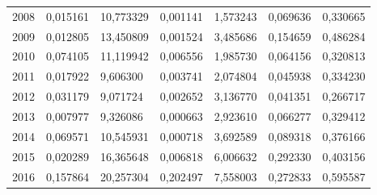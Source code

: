 \begin{table}
\begin{tabular}{p{1cm}p{2cm}p{2cm}p{2cm}p{2cm}p{2cm}p{2cm}}
 2008 &                                          0,015161 &                                   10,773329 &                         0,001141 &                   1,573243 &                       0,069636 &                    0,330665 \\
 2009 &                                          0,012805 &                                   13,450809 &                         0,001524 &                   3,485686 &                       0,154659 &                    0,486284 \\
 2010 &                                          0,074105 &                                   11,119942 &                         0,006556 &                   1,985730 &                       0,064156 &                    0,320813 \\
 2011 &                                          0,017922 &                                    9,606300 &                         0,003741 &                   2,074804 &                       0,045938 &                    0,334230 \\
 2012 &                                          0,031179 &                                    9,071724 &                         0,002652 &                   3,136770 &                       0,041351 &                    0,266717 \\
 2013 &                                          0,007977 &                                    9,326086 &                         0,000663 &                   2,923610 &                       0,066277 &                    0,329412 \\
 2014 &                                          0,069571 &                                   10,545931 &                         0,000718 &                   3,692589 &                       0,089318 &                    0,376166 \\
 2015 &                                          0,020289 &                                   16,365648 &                         0,006818 &                   6,006632 &                       0,292330 &                    0,403156 \\
 2016 &                                          0,157864 &                                   20,257304 &                         0,202497 &                   7,558003 &                       0,272833 &                    0,595587 \\
\bottomrule
\end{tabular}
\end{table}
